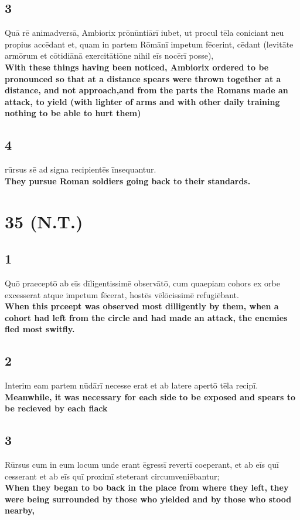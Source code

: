 \documentclass{article}
\begin{document}
\subsection*{3}
Quā rē animadversā, Ambiorix prōnūntiārī iubet, ut procul tēla coniciant neu propius accēdant et, quam in partem Rōmānī impetum fēcerint, cēdant (levitāte armōrum et cōtidiānā exercitātiōne nihil eīs nocērī posse), \\
\textbf{With these things having been noticed, Ambiorix ordered to be pronounced so that at a distance spears were thrown together at a distance, and not approach,and from the parts the Romans made an attack, to yield (with lighter of arms and with other daily training nothing to be able to hurt them)}
\subsection*{4}
rūrsus sē ad signa recipientēs īnsequantur. \\
\textbf{They pursue Roman soldiers going back to their standards.}

\section*{35 (N.T.)}
\subsection*{1}
Quō praeceptō ab eīs dīligentissimē observātō, cum quaepiam cohors ex orbe excesserat atque impetum fēcerat, hostēs vēlōcissimē refugiēbant.\\
\textbf{When this prceept was observed most dilligently by them, when a cohort had left from the circle and had made an attack, the enemies fled most switfly.}

\subsection*{2}
Interim eam partem nūdārī necesse erat et ab latere apertō tēla recipī.\\
\textbf{Meanwhile, it was necessary for each side to be exposed and spears to be recieved by each flack}

\subsection*{3}
Rūrsus cum in eum locum unde erant ēgressī revertī coeperant, et ab eīs quī cesserant et ab eīs quī proximī steterant circumveniēbantur; \\
\textbf{When they began to bo back in the place from where they left, they were being surrounded by those who yielded and by those who stood nearby,}
\end{document}
